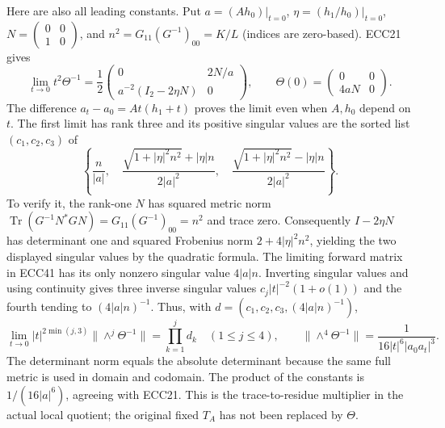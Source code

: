 \documentclass[11pt]{article}
\providecommand{\Tr}{\operatorname{Tr}}
\providecommand{\Tr}{\operatorname{Tr}}
\begin{document}
Here are also all leading constants. Put $a=(Ah_0)|_{t=0}$,
$\eta=(h_1/h_0)|_{t=0}$, $N=\left(\begin{smallmatrix}0&0\\1&0\end{smallmatrix}\right)$,
and $n^2=G_{11}(G^{-1})_{00}=K/L$ (indices are zero-based). ECC21 gives
\begin{equation}
 \lim_{t\to0}t^2\Theta^{-1}=
 \frac12\begin{pmatrix}0&2N/a\\a^{-2}(I_2-2\eta N)&0\end{pmatrix},\qquad
 \Theta(0)=\begin{pmatrix}0&0\\4aN&0\end{pmatrix}.
 \tag{ECC41}
\end{equation}
The difference $a_t-a_0=A t(h_1+t)$ proves the limit even when $A,h_0$
depend on $t$. The first limit has rank three and its positive singular
values are the sorted list $(c_1,c_2,c_3)$ of
\begin{equation}
 \left\{\frac n{|a|},\quad
 \frac{\sqrt{1+|\eta|^2n^2}+|\eta|n}{2|a|^2},\quad
 \frac{\sqrt{1+|\eta|^2n^2}-|\eta|n}{2|a|^2}\right\}.
 \tag{ECC42}
\end{equation}
To verify it, the rank-one $N$ has squared metric norm
$\Tr(G^{-1}N^*GN)=G_{11}(G^{-1})_{00}=n^2$ and trace zero.
Consequently $I-2\eta N$ has determinant one and squared Frobenius norm
$2+4|\eta|^2n^2$, yielding the two displayed singular values by the
quadratic formula. The limiting forward matrix in ECC41 has its only
nonzero singular value $4|a|n$. Inverting singular values and using
continuity gives three inverse singular values $c_j|t|^{-2}(1+o(1))$
and the fourth tending to $(4|a|n)^{-1}$. Thus, with
$d=(c_1,c_2,c_3,(4|a|n)^{-1})$,
\begin{equation}
 \lim_{t\to0}|t|^{2\min(j,3)}\|\wedge^j\Theta^{-1}\|
 =\prod_{k=1}^j d_k\quad(1\le j\le4),\qquad
 \|\wedge^4\Theta^{-1}\|=\frac1{16|t|^6|a_0a_t|^3}.
 \tag{ECC43}
\end{equation}
The determinant norm equals the absolute determinant because the same
full metric is used in domain and codomain. The product of the constants
is $1/(16|a|^6)$, agreeing with ECC21. This is the trace-to-residue
multiplier in the actual local quotient; the original fixed $T_A$
has not been replaced by $\Theta$.
\end{document}
